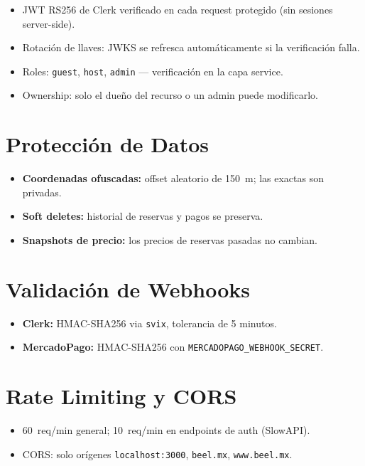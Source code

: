 \documentclass[12pt,a4paper]{report}
\begin{document}
\begin{itemize}[leftmargin=*]
  \item JWT RS256 de Clerk verificado en cada request protegido (sin sesiones server-side).
  \item Rotaci\'on de llaves: JWKS se refresca autom\'aticamente si la verificaci\'on falla.
  \item Roles: \texttt{guest}, \texttt{host}, \texttt{admin} --- verificaci\'on en la capa service.
  \item Ownership: solo el due\~no del recurso o un admin puede modificarlo.
\end{itemize}

\section{Protecci\'on de Datos}

\begin{itemize}[leftmargin=*]
  \item \textbf{Coordenadas ofuscadas:} offset aleatorio de 150~m; las exactas son privadas.
  \item \textbf{Soft deletes:} historial de reservas y pagos se preserva.
  \item \textbf{Snapshots de precio:} los precios de reservas pasadas no cambian.
\end{itemize}

\section{Validaci\'on de Webhooks}

\begin{itemize}[leftmargin=*]
  \item \textbf{Clerk:} HMAC-SHA256 via \texttt{svix}, tolerancia de 5 minutos.
  \item \textbf{MercadoPago:} HMAC-SHA256 con \texttt{MERCADOPAGO\_WEBHOOK\_SECRET}.
\end{itemize}

\section{Rate Limiting y CORS}

\begin{itemize}[leftmargin=*]
  \item 60~req/min general; 10~req/min en endpoints de auth (SlowAPI).
  \item CORS: solo or\'igenes \texttt{localhost:3000}, \texttt{beel.mx}, \texttt{www.beel.mx}.
\end{itemize}
\end{document}
